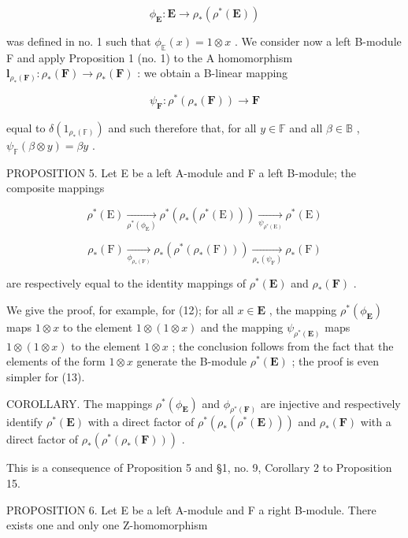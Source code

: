 \[
\phi_ {\mathbf {E}}: \mathbf {E} \rightarrow \rho_ {*} (\rho^ {*} (\mathbf {E}))\tag{10}
\]

was defined in no. 1 such that \(\phi_{\mathbb{E}}(x) = 1 \otimes x\) . We consider now a left B-module F and apply Proposition 1 (no. 1) to the A homomorphism \(\mathbf{l}_{\rho_{*}(\mathbf{F})}: \rho_{*}(\mathbf{F}) \to \rho_{*}(\mathbf{F})\) : we obtain a B-linear mapping

\[
\psi_ {\mathbf {F}} \colon \rho^ {*} (\rho_ {*} (\mathbf {F})) \rightarrow \mathbf {F}\tag{11}
\]

equal to \(\delta(1_{\rho_*(\mathbb{F})})\) and such therefore that, for all \(y \in \mathbb{F}\) and all \(\beta \in \mathbb{B}\) , \(\psi_{\mathbb{F}}(\beta \otimes y) = \beta y\) .

PROPOSITION 5. Let E be a left A-module and F a left B-module; the composite mappings

\[
\rho^ {*} (\mathrm{E}) \xrightarrow [ \rho^ {*} (\phi_ {\mathrm{E}}) ]{} \rho^ {*} (\rho_ {*} (\rho^ {*} (\mathrm{E}))) \xrightarrow [ \psi_ {\rho^ {*} (\mathrm{E})} ]{} \rho^ {*} (\mathrm{E})\tag{12}
\]

\[
\rho_ {*} (\mathrm{F}) \xrightarrow [ \phi_ {\rho_ {*} (\mathrm{F})} ]{} \rho_ {*} (\rho^ {*} (\rho_ {*} (\mathrm{F}))) \xrightarrow [ \rho_ {*} (\psi_ {\mathrm{F}}) ]{} \rho_ {*} (\mathrm{F})\tag{13}
\]

are respectively equal to the identity mappings of \(\rho^{*}(\mathbf{E})\) and \(\rho_{*}(\mathbf{F})\) .

We give the proof, for example, for (12); for all \(x \in \mathbf{E}\) , the mapping \(\rho^{*}(\phi_{\mathbf{E}})\) maps \(1 \otimes x\) to the element \(1 \otimes (1 \otimes x)\) and the mapping \(\psi_{\rho^{*}(\mathbf{E})}\) maps \(1 \otimes (1 \otimes x)\) to the element \(1 \otimes x\) ; the conclusion follows from the fact that the elements of the form \(1 \otimes x\) generate the B-module \(\rho^{*}(\mathbf{E})\) ; the proof is even simpler for (13).

COROLLARY. The mappings \(\rho^{*}(\phi_{\mathbf{E}})\) and \(\phi_{\rho^{*}(\mathbf{F})}\) are injective and respectively identify \(\rho^{*}(\mathbf{E})\) with a direct factor of \(\rho^{*}(\rho_{*}(\rho^{*}(\mathbf{E})))\) and \(\rho_{*}(\mathbf{F})\) with a direct factor of \(\rho_{*}(\rho^{*}(\rho_{*}(\mathbf{F})))\) .

This is a consequence of Proposition 5 and §1, no. 9, Corollary 2 to Proposition 15.

PROPOSITION 6. Let E be a left A-module and F a right B-module. There exists one and only one Z-homomorphism

